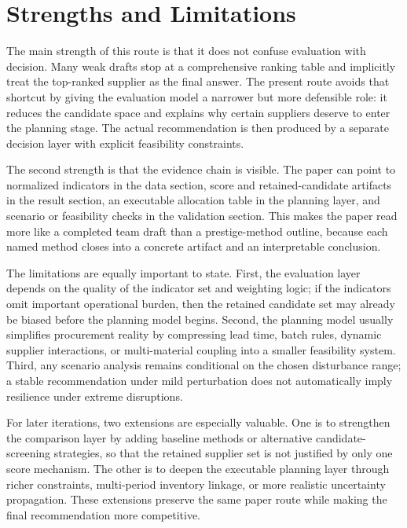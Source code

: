 \section{Strengths and Limitations}

The main strength of this route is that it does not confuse evaluation with decision. Many weak drafts stop at a comprehensive ranking table and implicitly treat the top-ranked supplier as the final answer. The present route avoids that shortcut by giving the evaluation model a narrower but more defensible role: it reduces the candidate space and explains why certain suppliers deserve to enter the planning stage. The actual recommendation is then produced by a separate decision layer with explicit feasibility constraints.

The second strength is that the evidence chain is visible. The paper can point to normalized indicators in the data section, score and retained-candidate artifacts in the result section, an executable allocation table in the planning layer, and scenario or feasibility checks in the validation section. This makes the paper read more like a completed team draft than a prestige-method outline, because each named method closes into a concrete artifact and an interpretable conclusion.

The limitations are equally important to state. First, the evaluation layer depends on the quality of the indicator set and weighting logic; if the indicators omit important operational burden, then the retained candidate set may already be biased before the planning model begins. Second, the planning model usually simplifies procurement reality by compressing lead time, batch rules, dynamic supplier interactions, or multi-material coupling into a smaller feasibility system. Third, any scenario analysis remains conditional on the chosen disturbance range; a stable recommendation under mild perturbation does not automatically imply resilience under extreme disruptions.

For later iterations, two extensions are especially valuable. One is to strengthen the comparison layer by adding baseline methods or alternative candidate-screening strategies, so that the retained supplier set is not justified by only one score mechanism. The other is to deepen the executable planning layer through richer constraints, multi-period inventory linkage, or more realistic uncertainty propagation. These extensions preserve the same paper route while making the final recommendation more competitive.
